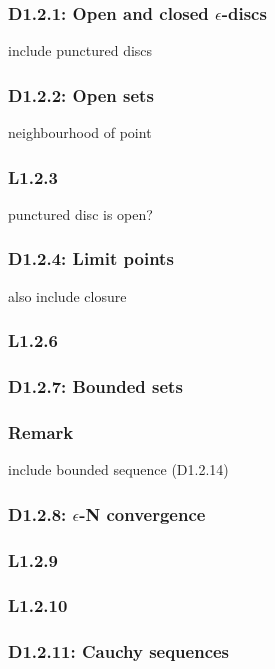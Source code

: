 \documentclass{article}
\begin{document}
\begin{multicols*}{3}
\subsubsection*{D1.2.1: Open and closed 
$\epsilon$-discs}
include punctured discs

\subsubsection*{D1.2.2: Open sets}
neighbourhood of point

\subsubsection*{L1.2.3}
punctured disc is open?

\subsubsection*{D1.2.4: Limit points}
also include closure

\subsubsection*{L1.2.6}

\subsubsection*{D1.2.7: Bounded sets}

\subsubsection{Remark}
include bounded sequence (D1.2.14)

\subsubsection*{D1.2.8: $\epsilon$-N convergence}

\subsubsection*{L1.2.9}

\subsubsection*{L1.2.10}

\subsubsection*{D1.2.11: Cauchy sequences}


\end{multicols*}
\end{document}
